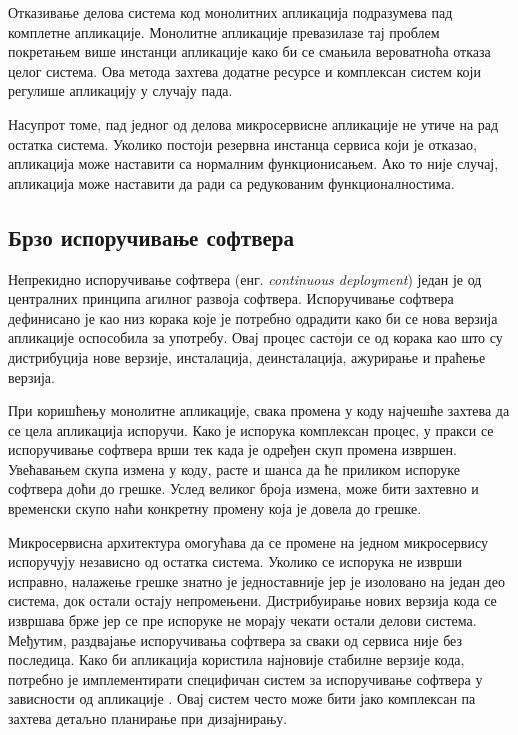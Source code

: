\documentclass[12pt,oneside]{memoir}
\begin{document}
Отказивање делова система код монолитних апликација подразумева пад комплетне апликације. Монолитне апликације превазилазе тај проблем покретањем више инстанци апликације како би се смањила вероватноћа отказа целог система. Ова метода захтева додатне ресурсе и комплексан систем који регулише апликацију у случају пада.

Насупрот томе, пад једног од делова микросервисне апликације не утиче на рад остатка система. Уколико постоји резервна инстанца сервиса који је отказао, апликација може наставити са нормалним функционисањем. Ако то није случај, апликација може наставити да ради са редукованим функционалностима.


\subsection{Брзо испоручивање софтвера}

Непрекидно испоручивање софтвера (енг. \textit{continuous deployment}) један је од централних принципа агилног развоја софтвера. Испоручивање софтвера дефинисано је као низ корака које је потребно одрадити како би се нова верзија апликације оспособила за употребу. Овај процес састоји се од корака као што су дистрибуција нове верзије, инсталација, деинсталација, ажурирање и праћење верзија.

При коришћењу монолитне апликације, свака промена у коду најчешће захтева да се цела апликација испоручи. Како је испорука комплексан процес, у пракси се испоручивање софтвера врши тек када је одређен скуп промена извршен. Увећавањем скупа измена у коду, расте и шанса да ће приликом испоруке софтвера доћи до грешке. Услед великог броја измена, може бити захтевно и временски скупо наћи конкретну промену која је довела до грешке.

Микросервисна архитектура омогућава да се промене на једном микросервису испоручују независно од остатка система. Уколико се испорука не изврши исправно, налажење грешке знатно је једноставније јер је изоловано на један део система, док остали остају непромењени. Дистрибуирање нових верзија кода се извршава брже јер се пре испоруке не морају чекати остали делови система. Међутим, раздвајање испоручивања софтвера за сваки од сервиса није без последица. Како би апликација користила најновије стабилне верзије кода, потребно је имплементирати специфичан систем за испоручивање софтвера у зависности од апликације \cite{microservicesBook}. Овај систем често може бити јако комплексан па захтева детаљно планирање при дизајнирању.
\end{document}
